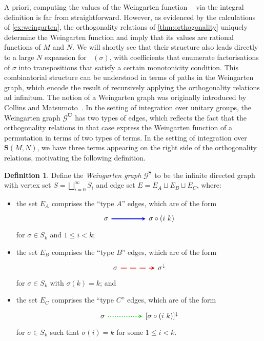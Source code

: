 \documentclass[a4paper]{article}
\theoremstyle{plain}
\numberwithin{theorem}{section}
\theoremstyle{definition}
\newtheorem{definition}[theorem]{Definition}
\theoremstyle{remark}
\renewcommand{\leq}{\leqslant}
\newcommand{\UM}{\mathbf{U}}			%
\newcommand{\SM}{\mathbf{S}}			%
\DeclareMathOperator{\SW}{Wg^{\SM}}		%
\newcommand{\SG}{S} 					%
\begin{document}
A priori, computing the values of the Weingarten function $\SW$ via the integral definition is far from straightforward. However, as evidenced by the calculations of \cref{ex:weingarten}, the orthogonality relations of \cref{thm:orthogonality} uniquely determine the Weingarten function and imply that its values are rational functions of $M$ and $N$. We will shortly see that their structure also leads directly to a large $N$ expansion for $\SW(\sigma)$, with coefficients that enumerate factorisations of $\sigma$ into transpositions that satisfy a certain monotonicity condition. This combinatorial structure can be understood in terms of paths in the Weingarten graph, which encode the result of recursively applying the orthogonality relations ad infinitum. The notion of a Weingarten graph was originally introduced by Collins and Matsumoto~\cite{col-mat17}. In the setting of integration over unitary groups, the Weingarten graph $\mathcal{G}^\UM$ has two types of edges, which reflects the fact that the orthogonality relations in that case express the Weingarten function of a permutation in terms of two types of terms. In the setting of integration over $\SM(M,N)$, we have three terms appearing on the right side of the orthogonality relations, motivating the following definition.


\begin{definition}
Define the {\em Weingarten graph} $\mathcal{G}^{\SM}$ to be the infinite directed graph with vertex set $\SG = \bigsqcup_{i=0}^\infty \SG_i$ and edge set $E = E_A \sqcup E_B \sqcup E_C$, where:
\begin{itemize}
\item the set $E_A$ comprises the ``type $A$'' edges, which are of the form 
\[\begin{tikzcd}
	\sigma & & {\sigma \circ (i~k)}
	\arrow[-stealth, very thick, blue!90!black, from=1-1, to=1-3]
\end{tikzcd}\]
for $\sigma \in \SG_k$ and $1 \leq i <k$;
\item the set $E_B$ comprises the ``type $B$'' edges, which are of the form
\[\begin{tikzcd}
	\sigma & & \sigma^\downarrow
	\arrow[-stealth, very thick, red!90!black, dashed, from=1-1, to=1-3]
\end{tikzcd}\]
for $\sigma \in \SG_k$ with $\sigma(k)=k$; and
\item the set $E_C$ comprises the ``type $C$'' edges, which are of the form
\[\begin{tikzcd}
	\sigma & & {[\sigma\circ(i~k)]^\downarrow}
	\arrow[-stealth, very thick, green!80!black, dotted, from=1-1, to=1-3]
\end{tikzcd}\]
for $\sigma\in \SG_k$ such that $\sigma(i) = k$ for some $1 \leq i <k$.
\end{itemize}
\end{definition}
\end{document}

